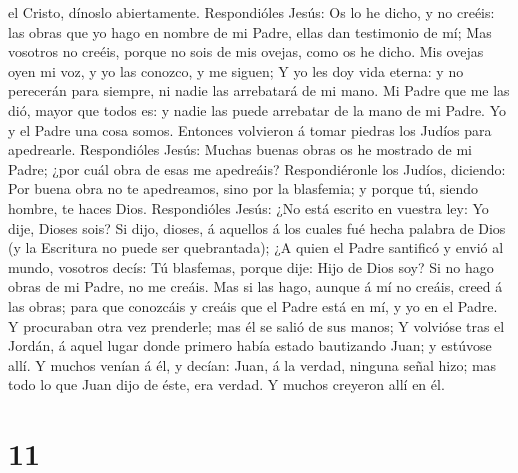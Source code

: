 el Cristo, dínoslo abiertamente.  Respondióles Jesús: Os
lo he dicho, y no creéis: las obras que yo hago en nombre de mi Padre,
ellas dan testimonio de mí;  Mas vosotros no creéis,
porque no sois de mis ovejas, como os he dicho.  Mis
ovejas oyen mi voz, y yo las conozco, y me siguen;  Y yo
les doy vida eterna: y no perecerán para siempre, ni nadie las
arrebatará de mi mano.  Mi Padre que me las dió, mayor
que todos es: y nadie las puede arrebatar de la mano de mi Padre.
 Yo y el Padre una cosa somos.  Entonces
volvieron á tomar piedras los Judíos para apedrearle. 
Respondióles Jesús: Muchas buenas obras os he mostrado de mi Padre; ¿por
cuál obra de esas me apedreáis?  Respondiéronle los
Judíos, diciendo: Por buena obra no te apedreamos, sino por la
blasfemia; y porque tú, siendo hombre, te haces Dios. 
Respondióles Jesús: ¿No está escrito en vuestra ley: Yo dije, Dioses
sois?  Si dijo, dioses, á aquellos á los cuales fué hecha
palabra de Dios (y la Escritura no puede ser quebrantada);
 ¿A quien el Padre santificó y envió al mundo, vosotros
decís: Tú blasfemas, porque dije: Hijo de Dios soy?  Si
no hago obras de mi Padre, no me creáis.  Mas si las
hago, aunque á mí no creáis, creed á las obras; para que conozcáis y
creáis que el Padre está en mí, y yo en el Padre.  Y
procuraban otra vez prenderle; mas él se salió de sus manos;
 Y volvióse tras el Jordán, á aquel lugar donde primero
había estado bautizando Juan; y estúvose allí.  Y muchos
venían á él, y decían: Juan, á la verdad, ninguna señal hizo; mas todo
lo que Juan dijo de éste, era verdad.  Y muchos creyeron
allí en él.

\hypertarget{section-10}{%
\section{11}\label{section-10}}

